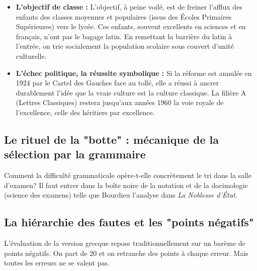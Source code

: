 \begin{itemize}\item \textbf{L'objectif de classe :} L'objectif, à peine voilé, est de freiner l'afflux des enfants des classes moyennes et populaires (issus des Écoles Primaires Supérieures) vers le lycée. Ces enfants, souvent excellents en sciences et en français, n'ont pas le bagage latin. En remettant la barrière du latin à l'entrée, on \og trie\fg{} socialement la population scolaire sous couvert d'unité culturelle.\item \textbf{L'échec politique, la réussite symbolique :} Si la réforme est annulée en 1924 par le Cartel des Gauches face au tollé, elle a réussi à ancrer durablement l'idée que la \og vraie\fg{} culture est la culture classique. La filière A (Lettres Classiques) restera jusqu'aux années 1960 la voie royale de l'excellence, celle des \og héritiers\fg{} par excellence.\cite{I-2-3-ref18}\end{itemize}

\subsection{Le rituel de la "botte" : mécanique de la sélection par la grammaire}

Comment la difficulté grammaticale opère-t-elle concrètement le tri dans la salle d'examen? Il faut
entrer dans la \og boîte noire\fg{} de la notation et de la docimologie (science des examens) telle
que Bourdieu l'analyse dans \textit{La Noblesse d'État}.



\subsection{La hiérarchie des fautes et les "points négatifs"}

L'évaluation de la version grecque repose traditionnellement sur un barème de \og points
négatifs\fg{}. On part de 20 et on retranche des points à chaque erreur.\cite{I-2-3-ref24} Mais
toutes les erreurs ne se valent pas.


